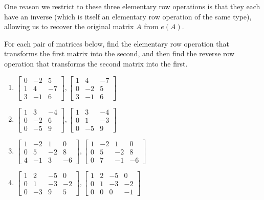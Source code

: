 \documentclass[12pt,letterpaper,reqno]{article}
\numberwithin{equation}{section}
\begin{document}
One reason we restrict to these three elementary row operations is that they each have an inverse (which is itself an elementary row operation of the same type), allowing us to recover the original matrix $A$ from $e(A)$.

\begin{exercise}
For each pair of matrices below, find the elementary row operation that transforms the first matrix into the second, and then find the reverse row operation that transforms the second matrix into the first.
	\begin{enumerate}
		\item $\begin{bmatrix}
			0&-2&5 \\ 1&4&-7 \\ 3&-1&6
		\end{bmatrix}, \begin{bmatrix}
			1&4&-7 \\ 0&-2&5 \\ 3&-1&6
		\end{bmatrix}$
		\item $\begin{bmatrix}
			1&3&-4 \\ 0&-2&6 \\ 0&-5&9
		\end{bmatrix}, \begin{bmatrix}
			1&3&-4 \\ 0&1&-3 \\ 0&-5&9
		\end{bmatrix}$
		\item $\begin{bmatrix}
			1&-2&1&0 \\ 0&5&-2&8 \\ 4&-1&3&-6
		\end{bmatrix}, \begin{bmatrix}
			1&-2&1&0 \\0&5&-2&8 \\ 0&7&-1&-6
		\end{bmatrix}$
		\item $\begin{bmatrix}
			1&2&-5&0 \\ 0&1&-3&-2 \\ 0&-3&9&5
		\end{bmatrix}, \begin{bmatrix}
			1&2&-5&0 \\ 0&1&-3&-2 \\ 0&0&0&-1
		\end{bmatrix}$
	\end{enumerate}	
\end{exercise}
\end{document}
